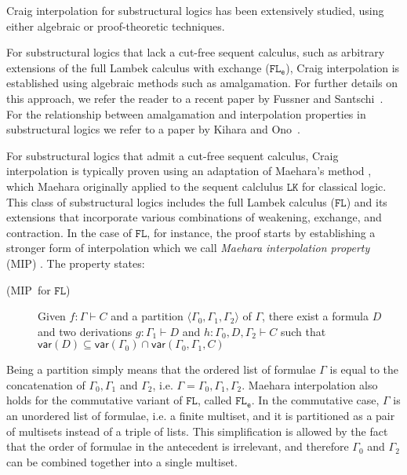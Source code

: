 \documentclass[sn-mathphys-num]{sn-jnl}%
\newcommand{\GG}{\Gamma}
\newcommand{\mf}[1]{\mathsf{#1}}
\newcommand{\vars}[1]{\mf{var} (#1)}
\newcommand{\FL}{$\mathtt{FL}$}
\newcommand{\FLe}{$\mathtt{FL_e}$}
\newcommand{\MIP}{\textsf{MIP}}
\newcommand{\niccolo}[1]{\textcolor{red}{NV: #1}}
\theoremstyle{thmstyleone}%
\theoremstyle{thmstyletwo}%
\theoremstyle{thmstylethree}%
\begin{document}
Craig interpolation for substructural logics has been extensively studied, using either algebraic or proof-theoretic techniques. 

For substructural logics that lack a cut-free sequent calculus, such as arbitrary extensions of the full Lambek calculus with exchange (\FLe), Craig interpolation is established using algebraic methods such as amalgamation.
For further details on this approach, we refer the reader to a recent paper by Fussner and Santschi~\cite{Fussner2024}.
For the relationship between amalgamation and interpolation properties in substructural logics we refer to a paper by Kihara and Ono~\cite{Kihara2009}.

For substructural logics that admit a cut-free sequent calculus, Craig interpolation is typically proven using an adaptation of Maehara's method \cite{maehara1961}, which Maehara originally applied to the sequent calclulus $\mathtt{LK}$ for classical logic.
This class of substructural logics includes the full Lambek calculus (\FL) and its extensions that incorporate various combinations of weakening, exchange, and contraction.
In the case of \FL, for instance, the proof starts by establishing a stronger form of interpolation which we call \emph{Maehara interpolation property} (\MIP) \cite{ono:proof:nonclassical:1998}. 
The property states:
\begin{description}
  \item[(\MIP~for \FL)] Given $f : \GG \vdash C$ and a partition $\langle \GG_0, \GG_1, \GG_2 \rangle$ of $\GG$, there exist a formula $D$ and two derivations $g : \GG_1 \vdash D$ and $h : \GG_0, D, \GG_2 \vdash C$ such that $\vars{D} \subseteq \vars{\GG_0} \cap \vars{\GG_0, \GG_1, C}$
\end{description}
Being a partition simply means that the ordered list of formulae $\GG$ is equal to the concatenation of $\GG_0, \GG_1$ and $\GG_2$, i.e. $\GG = \GG_0, \GG_1, \GG_2$.
Maehara interpolation also holds for the commutative variant of \FL, called \FLe.
In the commutative case, $\GG$ is an unordered list of formulae, i.e. a finite multiset, and it is partitioned as a pair of multisets instead of a triple of lists.
This simplification is allowed by the fact that the order of formulae in the antecedent is irrelevant, and therefore $\GG_0$ and $\GG_2$ can be combined together into a single multiset.
\end{document}
